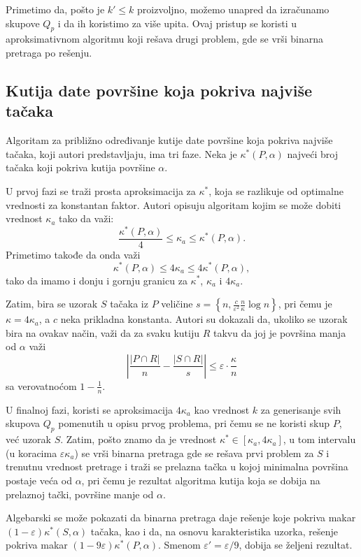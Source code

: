 \documentclass{article}
\begin{document}
Primetimo da, pošto je $k' \leqslant k$ proizvoljno, možemo unapred da izračunamo skupove $Q_p$ i da ih koristimo za više upita. Ovaj pristup se koristi u aproksimativnom algoritmu koji rešava drugi problem, gde se vrši binarna pretraga po rešenju.

\subsection{Kutija date površine koja pokriva najviše tačaka}

Algoritam za približno određivanje kutije date površine koja pokriva najviše tačaka, koji autori predstavljaju, ima tri faze. Neka je $\kappa^\ast (P, \alpha)$ najveći broj tačaka koji pokriva kutija površine $\alpha$.

U prvoj fazi se traži prosta aproksimacija za $\kappa^\ast$, koja se razlikuje od optimalne vrednosti za konstantan faktor. Autori opisuju algoritam kojim se može dobiti vrednost $\kappa_a$ tako da važi:
\[ \frac{\kappa^\ast (P, \alpha)}{4} \leqslant \kappa_a \leqslant \kappa^\ast (P, \alpha). \] Primetimo takođe da onda važi
\[ \kappa^\ast (P, \alpha) \leqslant 4 \kappa_a \leqslant 4 \kappa^\ast (P, \alpha) ,\] tako da imamo i donju i gornju granicu za $\kappa^\ast$, $\kappa_a$ i $4 \kappa_a$.

Zatim, bira se uzorak $S$ tačaka iz $P$ veličine $s = \left\{ n, \frac{c}{\varepsilon^2}\frac{n}{\kappa} \log n \right\}$, pri čemu je $\kappa = 4 \kappa_a$, a $c$ neka prikladna konstanta. Autori su dokazali da, ukoliko se uzorak bira na ovakav način, važi da za svaku kutiju $R$ takvu da joj je površina manja od $\alpha$ važi \[\left|\frac{\left|P \cap R\right|}{n} - \frac{\left|S \cap R\right|}{s}\right| \leqslant \varepsilon \cdot \frac{\kappa}{n}\]
sa verovatnoćom $1 - \frac{1}{n}$.

U finalnoj fazi, koristi se aproksimacija $4 \kappa_a$ kao vrednost $k$ za generisanje svih skupova $Q_p$ pomenutih u opisu prvog problema, pri čemu se ne koristi skup $P$, već uzorak $S$. Zatim, pošto znamo da je vrednost $\kappa^\ast \in \left[ \kappa_a, 4 \kappa_a \right]$, u tom intervalu (u koracima $\varepsilon \kappa_a$) se vrši binarna pretraga gde se rešava prvi problem za $S$ i trenutnu vrednost pretrage i traži se prelazna tačka u kojoj minimalna površina postaje veća od $\alpha$, pri čemu je rezultat algoritma kutija koja se dobija na prelaznoj tački, površine manje od $\alpha$.

Algebarski se može pokazati da binarna pretraga daje rešenje koje pokriva makar $(1 - \varepsilon) \kappa^\ast (S, \alpha)$ tačaka, kao i da, na osnovu karakteristika uzorka, rešenje pokriva makar $(1 - 9 \varepsilon) \kappa^\ast (P, \alpha)$. Smenom $\varepsilon' = \varepsilon / 9$, dobija se željeni rezultat.
\end{document}
